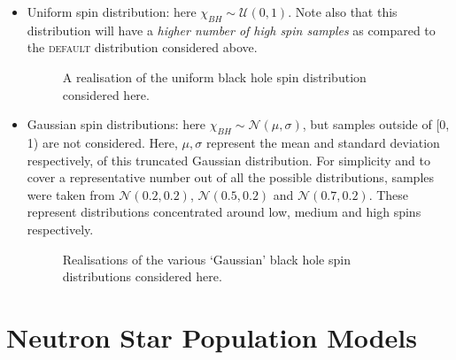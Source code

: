         \begin{itemize}

            \item Uniform spin distribution: here $\chi_{BH} \sim \mathcal{U}(0, 1)$.
                Note also that this distribution will have a \emph{higher number of high
                spin samples} as compared to the \textsc{default} distribution
                considered above.

                \begin{figure}[H]
                    \centering
                    \def\svgwidth{0.7\linewidth}
                    
                    \caption[Uniform Black Hole Spin Distribution]{
                        A realisation of the uniform black hole spin distribution
                        considered here.
                    }
                    \label{fig:unif_dist}
                \end{figure}

            \item Gaussian spin distributions: here $\chi_{BH} \sim \mathcal{N}(\mu,
                \sigma)$, but samples outside of [0, 1) are not considered. Here, $\mu,
                \sigma$ represent the mean and standard deviation respectively, of this
                truncated Gaussian distribution. For simplicity and to cover a
                representative number out of all the possible distributions, samples
                were taken from $\mathcal{N}(0.2, 0.2)$, $\mathcal{N}(0.5, 0.2)$ and
                $\mathcal{N}(0.7, 0.2)$. These represent distributions concentrated
                around low, medium and high spins respectively.

                \begin{figure}[H]
                    \centering
                    \def\svgwidth{0.8\linewidth}
                    
                    \caption[Gaussian Black Hole Spin Distributions]{
                        Realisations of the various `Gaussian' black hole spin
                        distributions considered here.
                    }
                    \label{fig:gauss_dists}
                \end{figure}

        \end{itemize}


\section{Neutron Star Population Models}\label{sec:ns_pop}

